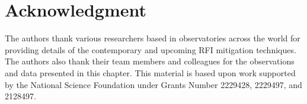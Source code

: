 \section{Acknowledgment}
\label{section:hardware:acknowledgment}
The authors thank various researchers based in observatories across the world for providing details of the contemporary and upcoming RFI mitigation techniques. The authors also thank their team members and colleagues for the observations and data presented in this chapter.
This material is based upon work supported by the National Science Foundation under Grants Number 2229428, 2229497, and 2128497.